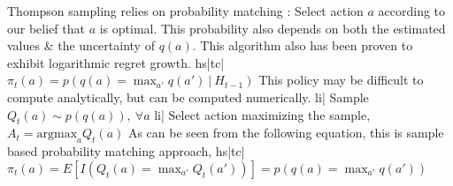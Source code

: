 Thompson sampling relies on probability matching : Select action \(a\) according to our belief that \(a\) is optimal. This probability also depends on both the estimated values & the uncertainty of \(q(a)\). This algorithm also has been proven to exhibit logarithmic regret growth.
hs|tc| \( \pi_t(a) = p(q(a) = \max_{a'} q(a') \ | \ H_{t-1}) \)
This policy may be difficult to compute analytically, but can be computed numerically.
li| Sample  \( Q_t(a) \sim p(q(a)), \ \forall a \)
li| Select action maximizing the sample, \( A_t = \text{argmax}_a Q_t(a) \)
As can be seen from the following equation, this is sample based probability matching approach,
hs|tc| \( \pi_t(a) = E[I(Q_t(a) = \max_{a'} Q_t(a'))] = p(q(a) = \max_{a'} q(a')) \)